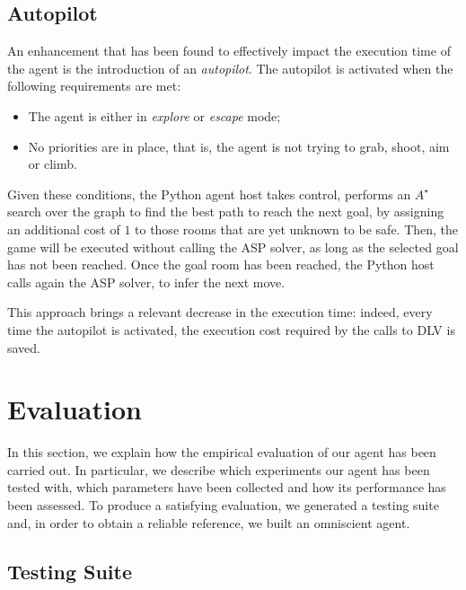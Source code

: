 \documentclass{llncs}
\begin{document}

\subsection{Autopilot}

An enhancement that has been found to effectively impact the execution time of the agent is the introduction of an \emph{autopilot}.
The autopilot is activated when the following requirements are met:
\begin{itemize}
	\item The agent is either in \emph{explore} or \emph{escape} mode;
	\item No priorities are in place, that is, the agent is not trying to grab, shoot, aim or climb.
\end{itemize}
Given these conditions, the Python agent host takes control, performs an $A^{\star}$ search over the graph to find the best path to reach the next goal, by assigning an additional cost of $1$ to those rooms that are yet unknown to be safe.
Then, the game will be executed without calling the ASP solver, as long as the selected goal has not been reached.
Once the goal room has been reached, the Python host calls again the ASP solver, to infer the next move.

This approach brings a relevant decrease in the execution time: indeed, every time the autopilot is activated, the execution cost required by the calls to DLV is saved.

\section{Evaluation}

In this section, we explain how the empirical evaluation of our agent has been carried out.
In particular, we describe which experiments our agent has been tested with, which parameters have been collected and how its performance has been assessed.
To produce a satisfying evaluation, we generated a testing suite and, in order to obtain a reliable reference, we built an omniscient agent.

\subsection{Testing Suite}
\end{document}
